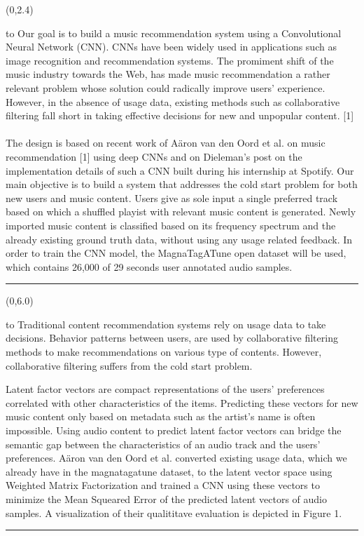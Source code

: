 \documentclass[a0]{a0poster}
\def\Head#1{
  \noindent\hbox to \hsize{\hfil{\LARGE\color{DarkBlue}\sf #1}}\bigskip}
\begin{document}
  \begin{textblock}{7}(0,2.4)
    \Head{Introduction}
    \sf %
    Our goal is to build a music recommendation system using a Convolutional
    Neural Network (CNN). CNNs have been widely used in applications such as
    image recognition and recommendation systems. The promiment shift of the
    music industry towards the Web, has made music recommendation a rather
    relevant problem whose solution could radically improve users' experience.
    However, in the absence of usage data, existing methods such as
    collaborative filtering fall short in taking effective decisions for new
    and unpopular content. [1]
    \\ \\
    The design is based on recent work of A\"{a}ron van den Oord et al. on
    music recommendation [1] using deep CNNs and on Dieleman's post on the
    implementation details of such a CNN built during his internship at
    Spotify. Our main objective is to build a system that addresses the cold
    start problem for both new users and music content. Users give as sole
    input a single preferred track based on which a shuffled playist with
    relevant music content is generated. Newly imported music content is
    classified based on its frequency spectrum and the already existing ground
    truth data, without using any usage related feedback. In order to train
    the CNN model, the MagnaTagATune open dataset will be used, which contains
    26,000 of 29 seconds user annotated audio samples.

    \bigskip
    \hrule
  \end{textblock}

  \begin{textblock}{7}(0,6.0)
    \Head{The Problem}
    \sf 
    Traditional content recommendation systems rely on usage data to take
    decisions. Behavior patterns between users, are used by collaborative
    filtering methods to make recommendations on various type of contents.
    However, collaborative filtering suffers from the cold start problem.

    Latent factor vectors are compact representations of the users'
    preferences correlated with other characteristics of the items. Predicting
    these vectors for new music content only based on metadata such as the
    artist's name is often impossible. Using audio content to predict latent
    factor vectors can bridge the semantic gap between the characteristics of
    an audio track and the users' preferences. A\"{a}ron van den Oord et al.
    converted existing usage data, which we already have in the magnatagatune
    dataset, to the latent vector space using Weighted Matrix Factorization and
    trained a CNN using these vectors to minimize the Mean Squeared Error of
    the predicted latent vectors of audio samples. A visualization of their
    qualititave evaluation is depicted in Figure 1.
    \bigskip
    \hrule
  \end{textblock}
\end{document}
